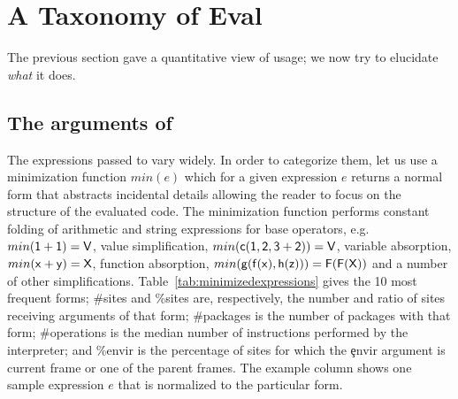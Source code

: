 \documentclass[screen,acmsmall]{acmart}
\begin{document}
\section{A Taxonomy of Eval}

The previous section gave a quantitative view of \eval usage; we now try to
elucidate \emph{what} it does.

\subsection{The arguments of \eval}

The expressions passed to \eval vary widely. In order to categorize them, let us
use a minimization function $min(e)$ which for a given expression $e$ returns a
normal form that abstracts incidental details allowing the reader to focus on
the structure of the evaluated code. The minimization function performs constant
folding of arithmetic and string expressions for base operators, e.g.
$min({\sf 1+1})={\sf V}$, value simplification, $min({\sf c(1,2,3+2)})={\sf V}$,
variable absorption, $min({\sf x+y})={\sf X}$, function absorption,
$min({\sf g(f(x),h(z))})={\sf F(F(X))}$ and a number of other simplifications.
Table~\ref{tab:minimizedexpressions} gives the 10 most frequent forms; \#sites
and \%sites are, respectively, the number and ratio of sites receiving arguments
of that form; \#packages is the number of packages with that form; \#operations
is the median number of instructions performed by the interpreter; and \%envir
is the percentage of sites for which the \c{envir} argument is current frame or one of the parent frames. The example column shows one sample
expression $e$ that is normalized to the particular form.
\end{document}
